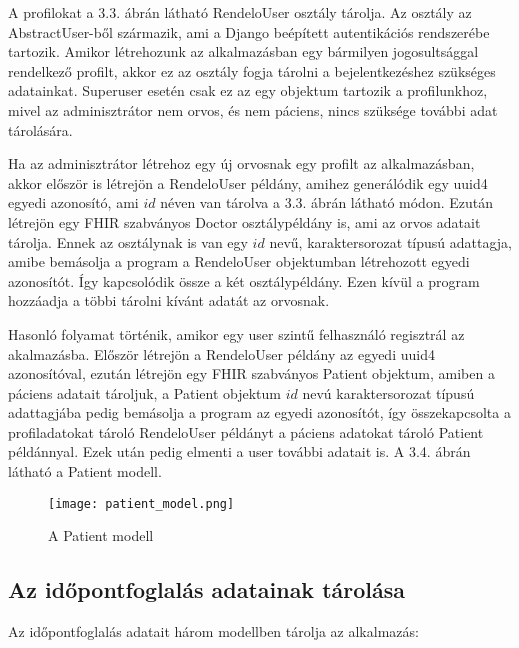 A profilokat a 3.3. ábrán látható RendeloUser osztály tárolja. Az osztály az AbstractUser-ből származik, ami a Django beépített autentikációs rendszerébe tartozik. Amikor létrehozunk az alkalmazásban egy bármilyen jogosultsággal rendelkező profilt, akkor ez az osztály fogja tárolni a bejelentkezéshez szükséges adatainkat. Superuser esetén csak ez az egy objektum tartozik a profilunkhoz, mivel az adminisztrátor nem orvos, és nem páciens, nincs szüksége további adat tárolására.

Ha az adminisztrátor létrehoz egy új orvosnak egy profilt az alkalmazásban, akkor először is létrejön a RendeloUser példány, amihez generálódik egy uuid4 egyedi azonosító, ami $id$ néven van tárolva a 3.3. ábrán látható módon. Ezután létrejön egy FHIR szabványos Doctor osztálypéldány is, ami az orvos adatait tárolja. Ennek az osztálynak is van egy $id$ nevű, karaktersorozat típusú adattagja, amibe bemásolja a program a RendeloUser objektumban létrehozott egyedi azonosítót. Így kapcsolódik össze a két osztálypéldány. Ezen kívül a program hozzáadja a többi tárolni kívánt adatát az orvosnak.

Hasonló folyamat történik, amikor egy user szintű felhasználó regisztrál az akalmazásba. Először létrejön a RendeloUser példány az egyedi uuid4 azonosítóval, ezután létrejön egy FHIR szabványos Patient objektum, amiben a páciens adatait tároljuk, a Patient objektum $id$ nevú karaktersorozat típusú adattagjába pedig bemásolja a program az egyedi azonosítót, így összekapcsolta a profiladatokat tároló RendeloUser példányt a páciens adatokat tároló Patient példánnyal. Ezek után pedig elmenti a user további adatait is. A 3.4. ábrán látható a Patient modell.

\begin{figure}[H]
	\caption{A Patient modell}
	\label{fig:patientmodel}
	\centering
	\texttt{[image: patient\_model.png]}
\end{figure}

\subsection{Az időpontfoglalás adatainak tárolása}

Az időpontfoglalás adatait három modellben tárolja az alkalmazás:

